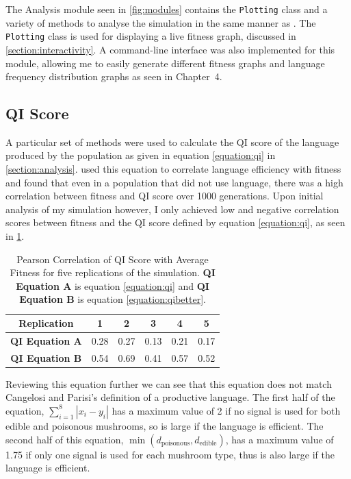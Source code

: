 \documentclass[12pt,a4paper]{report}
\begin{document}
The Analysis module seen in \cref{fig:modules} contains the \texttt{Plotting} class and a variety of methods to analyse the simulation in the same manner as \citet{Cangelosi1998}. The \texttt{Plotting} class is used for displaying a live fitness graph, discussed in \cref{section:interactivity}. A command-line interface was also implemented for this module, allowing me to easily generate different fitness graphs and language frequency distribution graphs as seen in Chapter~4.

\subsection{QI Score}

A particular set of methods were used to calculate the QI score of the language produced by the population as given in equation \ref{equation:qi} in \cref{section:analysis}. \citet{Cangelosi1998} used this equation to correlate language efficiency with fitness and found that even in a population that did not use language, there was a high correlation between fitness and QI score over 1000 generations. Upon initial analysis of my simulation however, I only achieved low and negative correlation scores between fitness and the QI score defined by equation \ref{equation:qi}, as seen in \cref{table:qi-correlation}.

\begin{table}[t]
\centering
 \begin{tabular}{ c || c | c | c | c | c}
 \bf{Replication} & \bf{1} & \bf{2} & \bf{3} & \bf{4} & \bf{5}\\
 \hline
  \hline
\bf {QI Equation A} & 0.28 & 0.27 & 0.13 & 0.21 & 0.17 \\
 \hline
\bf {QI Equation B} & 0.54 & 0.69 & 0.41 & 0.57 & 0.52 \\
\end{tabular}
\caption{Pearson Correlation of QI Score with Average Fitness for five replications of the simulation. {\bf QI Equation A} is equation \ref{equation:qi} and {\bf QI Equation B} is equation \ref{equation:qibetter}.}
\label{table:qi-correlation}
\end{table}

Reviewing this equation further we can see that this equation does not match Cangelosi and Parisi's  definition of a productive language. The first half of the equation, $\sum^{8}_{i = 1} |x_i - y_i|$ has a maximum value of 2 if no signal is used for both edible and poisonous mushrooms, so is large if the language is efficient. The second half of this equation, $\min (d_{\mathrm{poisonous}}, d_{\mathrm{edible}})$, has a maximum value of 1.75 if only one signal is used for each mushroom type, thus is also large if the language is efficient. 
\end{document}
